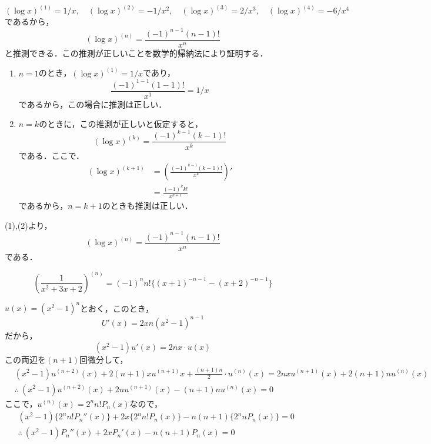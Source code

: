 


\begin{tanswer}
  \[
    ( \log x )^{(1)}= 1/x , \quad (\log x)^{(2)} = - 1/x^2 , \quad (\log x)^{(3)} = 2/x^3,\quad (\log x)^{(4)} = - 6 /x^4
  \]
  であるから，
  \[
    (\log x)^{(n)} = \frac{(-1)^{n-1}  (n-1)!}{x^n}
  \]
  と推測できる．この推測が正しいことを数学的帰納法により証明する．
  \begin{enumerate}
    \item $n=1$のとき，$(\log x)^{(1)} = 1/x$であり，
          \[
            \frac{(-1)^{1-1}  (1-1)!}{x^1}=1/x
          \]
          であるから，この場合に推測は正しい．
    \item $n=k$のときに，この推測が正しいと仮定すると，
          \[
            (\log x)^{(k)} = \frac{(-1)^{k-1}  (k-1)!}{x^k}
          \]
          である．ここで．
          \begin{align*}
            (\log x)^{(k+1)} & = \left (\frac{(-1)^{k-1}  (k-1)!}{x^k} \right ) ' \\
                             & = \frac{(-1)^k  k!}{x^{k+1}}
          \end{align*}
          であるから，$n=k+1$のときも推測は正しい．
  \end{enumerate}
  (1),(2)より，
  \[
    (\log x)^{(n)} = \frac{(-1)^{n-1}  (n-1)!}{x^n}
  \]
  である．
\end{tanswer}

\begin{tanswer}
  \[
    \left(   \frac{1}{x^2+3x+2} \right)^{(n)} = (-1)^n n! \{ (x+1)^{-n-1} - (x+2)^{-n-1} \}
  \]
\end{tanswer}




\begin{tproof}
  $u(x)= (x^2-1)^n$とおく，このとき，
  \[
    U'(x)= 2x n(x^2-1)^{n-1}
  \]
  だから，
  \[
    (x^2-1) u'(x)=2nx \cdot u(x)
  \]
  この両辺を$(n+1)$回微分して，
  \begin{align*}
     & (x^2-1)u^{(n+2)}(x)+2(n+1)x u^{(n+1)} x + \frac{(n+1)n}{2} \cdot u^{(n)} (x) = 2nx u^{(n+1)}(x) + 2(n+1) n u^{(n)}(x) \\
     & \therefore ~(x^2-1)u^{(n+2)}(x) + 2n u^{(n+1)}(x)-(n+1)n u^{(n)}(x)=0
  \end{align*}
  ここで，$ u^{(n)} (x)= 2^n n! P_n (x)$なので，
  \begin{align*}
     & (x^2 -1) \{ 2^n n! P_n ''(x) \} +2x \{ 2^n n! P_n (x) \} -n(n+1) \{ 2^n n P_n(x) \} =0 \\
     & \therefore ~ (x^2-1) P_n ''(x)+2x P_n '(x) -n(n+1) P_n (x)=0
  \end{align*}
\end{tproof}


